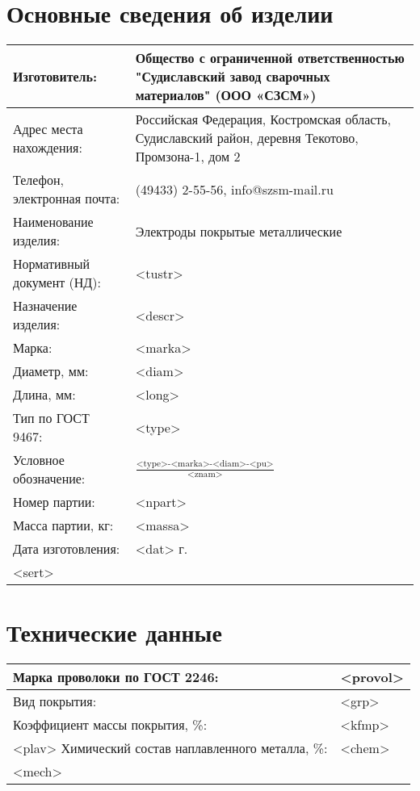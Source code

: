 \documentclass[russian,utf8,pointsection,nocolumnxxxi,nocolumnxxxii,12pt]{eskdtext}
\begin{document}
\maketitle

\tableofcontents
\pagebreak[4]

\section{ Основные сведения об изделии }

\begin{tabular}{|p{5cm}|p{10cm}|}
\hline 
Изготовитель: & Общество с ограниченной ответственностью "Судиславский завод сварочных материалов" (ООО «СЗСМ»)  \\
\hline 
Адрес места нахождения: & Российская Федерация, Костромская область, Судиславский район, деревня Текотово, Промзона-1, дом 2  \\
\hline 
Телефон, электронная почта: & (49433) 2-55-56, info@szsm-mail.ru \\
\hline 
Наименование изделия: & Электроды покрытые металлические \\
\hline 
Нормативный документ (НД): & <tustr> \\
\hline 
Назначение изделия:  & <descr> \\
\hline 
Марка: & <marka> \\
\hline 
Диаметр, мм: & <diam> \\
\hline 
Длина, мм: & <long> \\
\hline 
Тип по ГОСТ 9467: & <type> \\
\hline 
Условное обозначение: & \vspace{-2.5mm}  $ \frac {\text{<type>-<marka>-<diam>-<pu>}}{\text{<znam>}} $ \vspace{2.5mm}\\
\hline 
Номер партии: & <npart> \\
\hline 
Масса партии, кг: & <massa> \\
\hline 
Дата изготовления: & <dat> г. \\
\hline 
<sert>
\end{tabular}

\section{Технические данные}

\begin{longtable}{|p{5cm}|p{10cm}|}
\hline 
Марка проволоки по ГОСТ 2246: & <provol>  \\
\hline 
Вид покрытия: & <grp>  \\
\hline 
Коэффициент массы покрытия, \%: & <kfmp> \\
\hline 
<plav>
Химический состав наплавленного металла, \%: &  
\vspace{-2.5mm} 
<chem>
\vspace{2.5mm} 
\\
\hline 
<mech>
\end{longtable}
\end{document}
